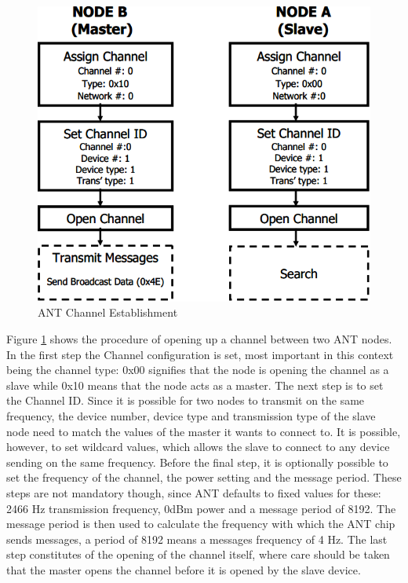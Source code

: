 \begin{figure}[H]
	\centering
	\includegraphics[scale=0.7]{content/images/ANTsetup.png}
	\caption{ANT Channel Establishment\cite{DynastreamInnovationsInc.2013}}\label{fig:antsetup}
\end{figure}

Figure \ref{fig:antsetup} shows the procedure of opening up a channel between two ANT nodes. In the first step the Channel configuration is set, most important in this context being the channel type: 0x00 signifies that the node is opening the channel as a slave while 0x10 means that the node acts as a master. The next step is to set the Channel ID. Since it is possible for two nodes to transmit on the same frequency, the device number, device type and transmission type of the slave node need to match the values of the master it wants to connect to. It is possible, however, to set wildcard values, which allows the slave to connect to any device sending on the same frequency. Before the final step, it is optionally possible to set the frequency of the channel, the power setting and the message period. These steps are not mandatory though, since ANT defaults to fixed values for these: 2466 Hz transmission frequency, 0dBm power and a message period of 8192. The message period is then used to calculate the frequency with which the ANT chip sends messages, a period of 8192 means a messages frequency of 4 Hz. The last step constitutes of the opening of the channel itself, where care should be taken that the master opens the channel before it is opened by the slave device.

